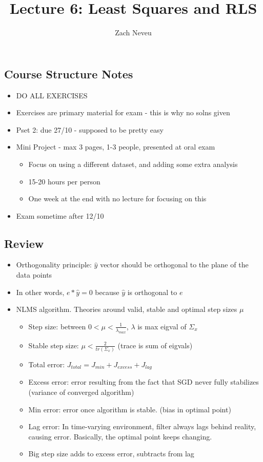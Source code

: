 \documentclass[12pt, letter]{article}
\author{Zach Neveu}
\title{ Lecture 6: Least Squares and RLS }
\begin{document}
\maketitle
\subsection*{Course Structure Notes}
\begin{itemize}
	\item DO ALL EXERCISES
	\item Exercises are primary material for exam - this is why no solns given
	\item Pset 2: due 27/10 - supposed to be pretty easy
	\item Mini Project - max 3 pages, 1-3 people, presented at oral exam
	\begin{itemize}
		\item Focus on using a different dataset, and adding some extra analysis
		\item 15-20 hours per person
		\item One week at the end with no lecture for focusing on this
	\end{itemize}
	\item Exam sometime after 12/10
\end{itemize}


\subsection*{Review}
\begin{itemize}
	\item Orthogonality principle: $\hat{y}$ vector should be orthogonal to the plane of the data points
	\item In other words, $e*\hat{y} = 0$ because $\hat{y}$ is orthogonal to $e$ 
	\item NLMS algorithm. Theories around valid, stable and optimal step sizes $\mu$
	 \begin{itemize}
		\item Step size: between $0 < \mu  < \frac{1}{\lambda_{max}}$, $\lambda$ is max eigval of $\Sigma_x$
		\item Stable step size: $\mu < \frac{2}{tr(\Sigma_x)}$ (trace is sum of eigvals)
		\item Total error: $J_{total} = J_{min} + J_{excess} + J_{lag}$
		\item Excess error: error resulting from the fact that SGD never fully stabilizes (variance of converged algorithm)
		\item Min error: error once algorithm is stable. (bias in optimal point)
		\item Lag error: In time-varying environment, filter always lags behind reality, causing error. Basically, the optimal point keeps changing.
		\item Big step size adds to excess error, subtracts from lag
	\end{itemize}
\end{itemize}
\end{document}

